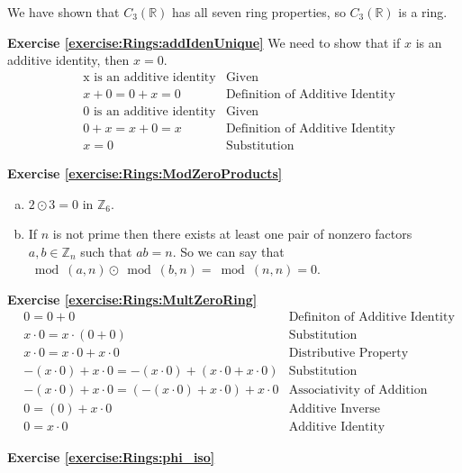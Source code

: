 We have shown that $C_3({\mathbb R})$ has all seven ring properties, so $C_3({\mathbb R})$ is a ring.



\noindent\textbf{Exercise \ref{exercise:Rings:addIdenUnique}}
We need to show that if $x$ is an additive identity, then $x=0$.
\begin{align*}
&\text{x is an additive identity} & \text{Given}\\
&x+0=0+x=0 & \text{Definition of Additive Identity}\\
&\text{0 is an additive identity} & \text{Given}\\  
&0+x=x+0=x & \text{Definition of Additive Identity} \\
&x=0 & \text{Substitution}
\end{align*}

\noindent\textbf{Exercise \ref{exercise:Rings:ModZeroProducts}}
\begin{enumerate}[(a)]
    \item $2\odot 3=0$ in ${\mathbb Z}_6$.
    \item If $n$ is not prime then there exists at least one pair of nonzero factors $a,b\in{\mathbb Z}_n$ such that $ab=n$.  So we can say that $\bmod(a,n)\odot\bmod(b,n)=\bmod(n,n)=0$.
\end{enumerate}

\noindent\textbf{Exercise \ref{exercise:Rings:MultZeroRing}}
\begin{align*}
&0=0+0 & \text{Definiton of Additive Identity}\\
&x\cdot0=x\cdot(0+0) & \text{Substitution}\\
&x\cdot0=x\cdot0+x\cdot0 & \text{Distributive Property}\\
&-(x\cdot 0)+x\cdot0=-(x\cdot 0)+(x\cdot0+x\cdot0) & \text{Substitution}\\
&-(x\cdot0)+x\cdot0=(-(x\cdot 0)+x\cdot0)+x\cdot0 & \text{Associativity of Addition}\\
&0=(0)+x\cdot0 & \text{Additive Inverse}\\
&0=x\cdot 0 & \text{Additive Identity}
\end{align*}


\noindent\textbf{Exercise \ref{exercise:Rings:phi_iso}}







